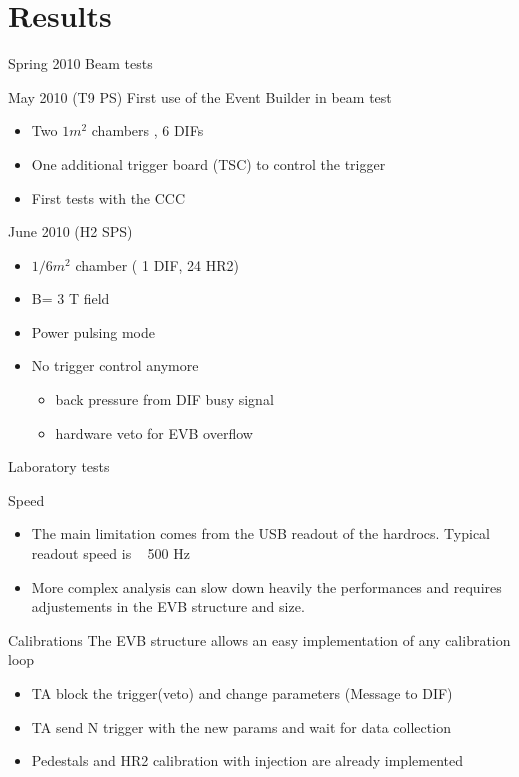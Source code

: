 \documentclass[10pt]{beamer}
\begin{document}
\section{Results}
\begin{frame}{Spring 2010 Beam tests}
\begin{block}{May 2010 (T9 PS)}
  First use of the Event Builder in beam test
    \begin{itemize}
      \item Two $1  m^2$ chambers , 6 DIFs
      \item One additional trigger board (TSC) to control the trigger
      \item First tests with the CCC 
    \end{itemize}
\end{block}
\pause \begin{block}{June 2010 (H2 SPS)}
    \begin{itemize}
      \item $1/6 m^2$ chamber ( 1 DIF, 24 HR2)
      \item B= 3 T field
      \item Power pulsing mode
      \item No trigger control anymore
        \begin{itemize}
          \item back pressure from DIF busy signal
          \item hardware veto for EVB overflow 
        \end{itemize}      
    \end{itemize}
\end{block}
\end{frame}
\begin{frame}{Laboratory tests}
\begin{block}{Speed}
  \begin{itemize}
  \item The main limitation comes from the USB readout of the hardrocs. Typical readout speed is ~ 500 Hz
  \item More complex analysis can slow down heavily the performances and requires adjustements in the EVB structure and size.
\end{itemize}
\end{block}
\pause
\begin{block}{Calibrations}
The EVB structure allows an easy implementation of any calibration loop
\begin{itemize}
\item TA block the trigger(veto) and change parameters (Message to DIF)
\item TA send N trigger with the new params and wait for data collection
\item Pedestals and HR2 calibration with injection are already implemented 
\end{itemize}
\end{block}
\end{frame}
\end{document}

